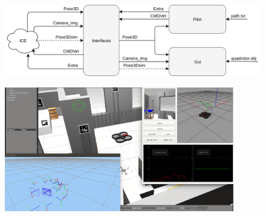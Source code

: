 \documentclass[notes,slidesec,a4]{seminar}
\begin{document}
\begin{hslide}

\begin{center}
	\begin{figure}
		\centering
		\includegraphics[width=12cm]{img/navigatorinter}
	\end{figure}
\end{center}

\end{hslide}


\begin{hslide}

\begin{center}
	\begin{figure}
		\centering
		\includegraphics[width=10cm]{img/sistemacompleto}
	\end{figure}
\end{center}

\end{hslide}
\end{document}
